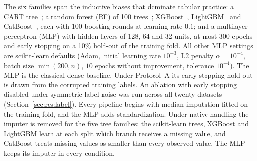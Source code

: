 \documentclass[pdflatex,sn-mathphys]{sn-jnl}
\theoremstyle{thmstyleone}
\theoremstyle{thmstyletwo}
\theoremstyle{thmstylethree}
\begin{document}
The six families span the inductive biases that dominate tabular practice: a CART tree~\cite{breiman1984classification}; a random forest (RF) of 100 trees~\cite{breiman2001random}; XGBoost~\cite{chen2016xgboost}, LightGBM~\cite{ke2017lightgbm} and CatBoost~\cite{prokhorenkova2018catboost}, each with 100 boosting rounds at learning rate $0.1$; and a multilayer perceptron (MLP) with hidden layers of 128, 64 and 32 units, at most 300 epochs and early stopping on a 10\% hold-out of the training fold. All other MLP settings are scikit-learn defaults (Adam, initial learning rate $10^{-3}$, L2 penalty $\alpha=10^{-4}$, batch size $\min(200,n)$, $10$ epochs without improvement, tolerance $10^{-4}$). The MLP is the classical dense baseline. Under Protocol~A its early-stopping hold-out is drawn from the corrupted training labels. An ablation with early stopping disabled under symmetric label noise was run across all twenty datasets (Section~\ref{sec:res:label}). Every pipeline begins with median imputation fitted on the training fold, and the MLP adds standardization. Under native handling the imputer is removed for the five tree families: the scikit-learn trees, XGBoost and LightGBM learn at each split which branch receives a missing value, and CatBoost treats missing values as smaller than every observed value. The MLP keeps its imputer in every condition.
\end{document}
